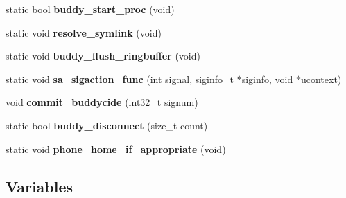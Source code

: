\begin{DoxyCompactItemize}
static bool {\bf buddy\_\-start\_\-proc} (void)
\item 
static void {\bf resolve\_\-symlink} (void)
\item 
static void {\bf buddy\_\-flush\_\-ringbuffer} (void)
\item 
static void {\bf sa\_\-sigaction\_\-func} (int signal, siginfo\_\-t $\ast$siginfo, void $\ast$ucontext)
\item 
void {\bf commit\_\-buddycide} (int32\_\-t signum)
\item 
static bool {\bf buddy\_\-disconnect} (size\_\-t count)
\item 
static void {\bf phone\_\-home\_\-if\_\-appropriate} (void)
\end{DoxyCompactItemize}
\subsection*{Variables}
